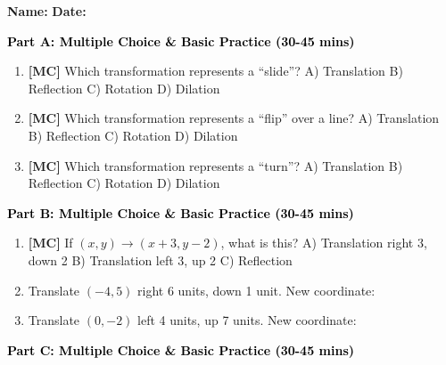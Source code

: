 \documentclass[12pt, letterpaper, fleqn]{article}
\newcommand{\blank}{\underline{\hspace{2.2cm}}}
\begin{document}
\textbf{Name:} \underline{\hspace{5cm}}
\hfill
\textbf{Date:} \underline{\hspace{3cm}}\\


\begin{tcolorbox}[colback=customteal!20]
\large\textcolor{black}{\textbf{Part A: Multiple Choice \& Basic Practice (30-45 mins)}}
\end{tcolorbox}

\vspace{3mm}

\begin{enumerate}[itemsep=2.5cm, leftmargin=0.6cm]
\item \textbf{[MC]} Which transformation represents a ``slide''?
A) Translation \quad B) Reflection \quad C) Rotation \quad D) Dilation
\item \textbf{[MC]} Which transformation represents a ``flip'' over a line?
A) Translation \quad B) Reflection \quad C) Rotation \quad D) Dilation
\item \textbf{[MC]} Which transformation represents a ``turn''?
A) Translation \quad B) Reflection \quad C) Rotation \quad D) Dilation
\end{enumerate}

\newpage

\begin{tcolorbox}[colback=customteal!20]
\large\textcolor{black}{\textbf{Part B: Multiple Choice \& Basic Practice (30-45 mins)}}
\end{tcolorbox}

\vspace{3mm}

\begin{enumerate}[itemsep=2.5cm, leftmargin=0.6cm, resume]
\item \textbf{[MC]} If $(x,y) \rightarrow (x+3, y-2)$, what is this?
A) Translation right 3, down 2 \quad B) Translation left 3, up 2 \quad C) Reflection
\item Translate $(-4, 5)$ right 6 units, down 1 unit. New coordinate: \blank
\item Translate $(0, -2)$ left 4 units, up 7 units. New coordinate: \blank
\end{enumerate}

\newpage

\begin{tcolorbox}[colback=customteal!20]
\large\textcolor{black}{\textbf{Part C: Multiple Choice \& Basic Practice (30-45 mins)}}
\end{tcolorbox}
\end{document}
